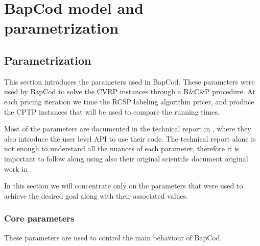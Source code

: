 \chapter{BapCod model and parametrization}


%
%
%

\section{Parametrization}

This section introduces the parameters used in BapCod.
These parameters were used by BapCod to solve the CVRP instances through a B\&C\&P procedure.
At each pricing iteration we time the RCSP labeling algorithm pricer, and produce the CPTP instances that will be used to compare the running times.


Most of the parameters are documented in the technical report in \cite{sadykov2021}, where they also introduce the user level API to use their code.
The technical report alone is not enough to understand all the nuances of each parameter, therefore it is important to follow along using also their original scientific document original work in \cite{pessoa2020}.

In this section we will concentrate only on the parameters that were used to achieve the desired goal along with their associated values.

\subsection{Core parameters}

These parameters are used to control the main behaviour of BapCod.

